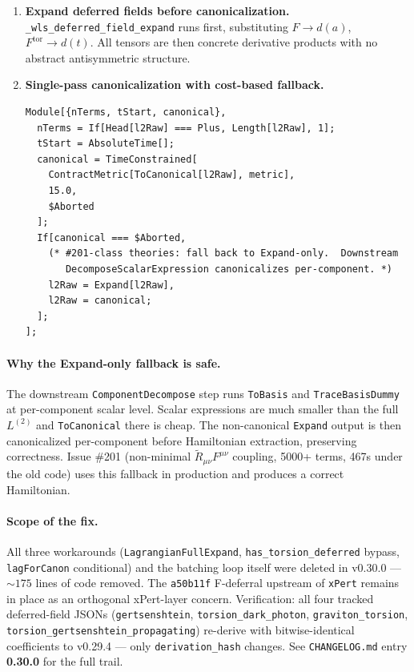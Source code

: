 \begin{enumerate}
  \item \textbf{Expand deferred fields before canonicalization.}
    \texttt{\_wls\_deferred\_field\_expand} runs first, substituting
    $F \to d(a)$, $F^{\text{tor}} \to d(t)$. All tensors are then
    concrete derivative products with no abstract antisymmetric
    structure.
  \item \textbf{Single-pass canonicalization with cost-based fallback.}
\begin{verbatim}
Module[{nTerms, tStart, canonical},
  nTerms = If[Head[l2Raw] === Plus, Length[l2Raw], 1];
  tStart = AbsoluteTime[];
  canonical = TimeConstrained[
    ContractMetric[ToCanonical[l2Raw], metric],
    15.0,
    $Aborted
  ];
  If[canonical === $Aborted,
    (* #201-class theories: fall back to Expand-only.  Downstream
       DecomposeScalarExpression canonicalizes per-component. *)
    l2Raw = Expand[l2Raw],
    l2Raw = canonical;
  ];
];
\end{verbatim}
\end{enumerate}

\paragraph{Why the Expand-only fallback is safe.} The downstream
\texttt{ComponentDecompose} step runs \texttt{ToBasis} and
\texttt{TraceBasisDummy} at per-component scalar level. Scalar
expressions are much smaller than the full $L^{(2)}$ and
\texttt{ToCanonical} there is cheap. The non-canonical \texttt{Expand}
output is then canonicalized per-component before Hamiltonian extraction,
preserving correctness. Issue \#201 (non-minimal $\tilde R_{\mu\nu} F^{\mu\nu}$
coupling, 5000+ terms, 467s under the old code) uses this fallback in
production and produces a correct Hamiltonian.

\paragraph{Scope of the fix.} All three workarounds
(\texttt{LagrangianFullExpand}, \texttt{has\_torsion\_deferred} bypass,
\texttt{lagForCanon} conditional) and the batching loop itself were
deleted in v0.30.0 — $\sim 175$ lines of code removed. The
\texttt{a50b11f} F-deferral upstream of \texttt{xPert} remains in place
as an orthogonal xPert-layer concern. Verification: all four tracked
deferred-field JSONs (\texttt{gertsenshtein}, \texttt{torsion\_dark\_photon},
\texttt{graviton\_torsion}, \texttt{torsion\_gertsenshtein\_propagating})
re-derive with bitwise-identical coefficients to v0.29.4 — only
\texttt{derivation\_hash} changes. See \texttt{CHANGELOG.md} entry
\textbf{0.30.0} for the full trail.

